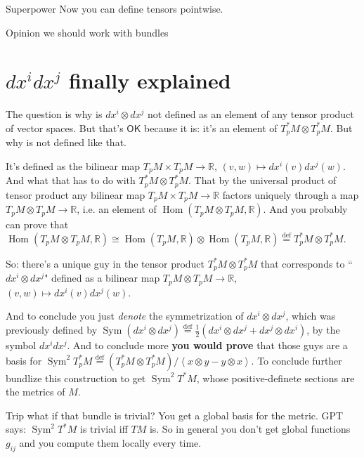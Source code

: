 \begin{thing8}{Superpower}\leavevmode
Now you can define tensors pointwise.
\end{thing8}

\begin{thing6}{Opinion}\leavevmode
we should work with bundles
\end{thing6}

\section{\(dx^idx^j\) finally explained}

The question is why is \(dx^i  \otimes dx^j\) not defined as an element of any tensor product of vector spaces. But that's  $\mathsf{OK}$ because it is: it's an element of \(T_p^*M\otimes T^*_pM\). But why is not defined like that.

It's defined as the bilinear map \(T_pM \times T_pM\to \mathbb{R}\), \((v,w)\mapsto dx^i(v)dx^j(w)\). And what that has to do with \(T_p ^*M\otimes T_p ^*M\). That by the universal product of tensor product any bilinear map \(T_pM \times T_pM\to \mathbb{R}\) factors uniquely through a map \(T_pM \otimes T_pM \to \mathbb{R}\), i.e. an element of \(\operatorname{Hom}(T_pM \otimes T_pM, \mathbb{R})\). And you probably can prove that \(\operatorname{Hom}(T_pM \otimes T_p M, \mathbb{R})\cong \operatorname{Hom}(T_pM,\mathbb{R})\otimes \operatorname{Hom}(T_pM, \mathbb{R})\overset{\operatorname{def}}{=}T_p ^*M \otimes T^*_pM\).

So: there's a unique guy in the tensor product \(T_p ^*M \otimes T^*_pM\) that corresponds to ``\(dx^i \otimes dx^j\)" defined as a bilinear map \(T_pM \otimes T_pM\to \mathbb{R}\), \((v,w)\mapsto dx^i(v)dx^j(w)\).

And to conclude you just \textit{denote} the symmetrization of \(dx^i \otimes dx^j\), which was previously defined by \(\operatorname{Sym}(dx^i \otimes dx^j)\overset{\operatorname{def}}{=}\frac{1}{2}(dx^i \otimes dx^j +dx^j \otimes dx^i)\), by the symbol \(dx^idx^j\). And to conclude more \textbf{you would prove} that those guys are a basis for \(\operatorname{Sym}^2T_p^*M\overset{\operatorname{def}}{=}(T_p^* M \otimes T_p^*M)/\left<x \otimes y-y \otimes x\right>\). To conclude further bundlize this construction to get \(\operatorname{Sym}^2T^*M\), whose positive-definete sections are the metrics of \(M\).

\begin{thing8}{Trip}\leavevmode
what if that bundle is trivial? You get a global basis for the metric. GPT says: \(\operatorname{Sym}^2T^*M\) is trivial iff \(TM\) is. So in general you don't get global functions \(g_{ij}\) and you compute them locally every time.
\end{thing8}

